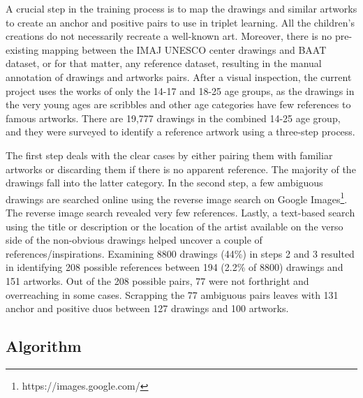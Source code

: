 A crucial step in the training process is to map the drawings and similar artworks to create an anchor and positive pairs to use in triplet learning. All the children's creations do not necessarily recreate a well-known art. Moreover, there is no pre-existing mapping between the IMAJ UNESCO center drawings and BAAT dataset, or for that matter, any reference dataset, resulting in the manual annotation of drawings and artworks pairs. After a visual inspection, the current project uses the works of only the 14-17 and 18-25 age groups, as the drawings in the very young ages are scribbles and other age categories have few references to famous artworks. There are 19,777 drawings in the combined 14-25 age group, and they were surveyed to identify a reference artwork using a three-step process.

The first step deals with the clear cases by either pairing them with familiar artworks or discarding them if there is no apparent reference. The majority of the drawings fall into the latter category. In the second step, a few ambiguous drawings are searched online using the reverse image search on Google Images\footnote{https://images.google.com/}. The reverse image search revealed very few references. Lastly, a text-based search using the title or description or the location of the artist available on the verso side of the non-obvious drawings helped uncover a couple of references/inspirations. Examining 8800 drawings (44\%) in steps 2 and 3 resulted in identifying 208 possible references between 194 (2.2\% of 8800) drawings and 151 artworks. Out of the 208 possible pairs, 77 were not forthright and overreaching in some cases. Scrapping the 77 ambiguous pairs leaves with 131 anchor and positive duos between 127 drawings and 100 artworks.


\subsection{Algorithm}

